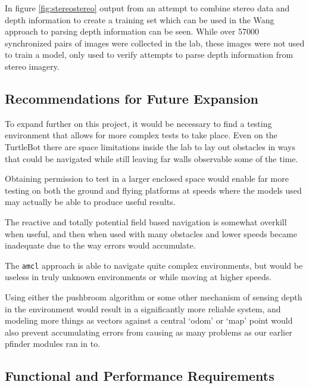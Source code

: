\documentclass{article}[12]
\begin{document}
In figure \ref{fig:stereostereo} output from an attempt to combine stereo data and depth information to create a training set which can be used in the Wang \cite{Wang_2018_CVPR} approach to parsing depth information can be seen. While over 57000 synchronized pairs of images were collected in the lab, these images were not used to train a model, only used to verify attempts to parse depth information from stereo imagery.

\subsection{Recommendations for Future Expansion}

To expand further on this project, it would be necessary to find a testing environment that allows for more complex tests to take place. Even on the TurtleBot there are space limitations inside the lab to lay out obstacles in ways that could be navigated while still leaving far walls observable some of the time. 

Obtaining permission to test in a larger enclosed space would enable far more testing on both the ground and flying platforms at speeds where the models used may actually be able to produce useful results. 

The reactive and totally potential field based navigation is somewhat overkill when useful, and then when used with many obstacles and lower speeds became inadequate due to the way errors would accumulate.

The \texttt{amcl}  approach is able to navigate quite complex environments, but would be useless in truly unknown environments or while moving at higher speeds. 

Using either the pushbroom algorithm or some other mechanism of sensing depth in the environment would result in a significantly more reliable system, and modeling more things as vectors against a central `odom' or `map' point would also prevent accumulating errors from causing as many problems as our earlier pfinder modules ran in to.
 
 \subsection{Functional and Performance Requirements}
\end{document}
